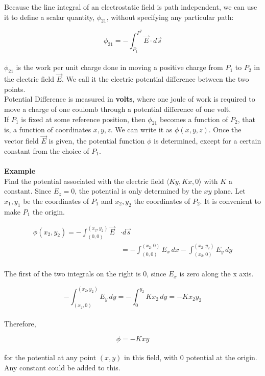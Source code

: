 \documentclass[svgnames]{article}
\begin{document}
Because the line integral of an electrostatic field is path independent, we can use it to define a scalar quantity, $\phi_{21}$, without specifying any particular path: 

\[ \phi_{21} = -\int_{P_1}^{P^2} \vec{E} \cdot d\vec{s} \] \\

$\phi_{21}$ is the work per unit charge done in moving a positive charge from $P_1$ to $P_2$ in the electric field $\vec{E}$. We call it the electric potential difference between the two points. \\ 
Potential Difference is measured in \textbf{volts}, where one joule of work is required to move a charge of one coulomb through a potential difference of one volt. \\
If $P_1$ is fixed at some reference position, then $\phi_{21}$ becomes a function of $P_2$, that is, a function of coordinates $x, y, z$. We can write it as $\phi(x, y, z)$. Once the vector field $\vec{E}$ is given, the potential function $\phi$ is determined, except for a certain constant from the choice of $P_1$. \\ \\

\textbf{Example} \\
Find the potential associated with the electric field $\langle Ky, Kx, 0 \rangle$ with $K$ a constant. Since $E_z = 0$, the potential is only determined by the $xy$ plane. Let $x_1, y_1$ be the coordinates of $P_1$ and $x_2, y_2$ the coordinates of $P_2$. It is convenient to make $P_1$ the origin. 

\begin{align*} 
\phi(x_2, y_2) = -\int_{(0,0)}^{(x_2,y_2)} \vec{E} &\cdot d\vec{s} \\ 
& = - \int_{(0,0)}^{(x_2, 0)} E_x \, dx - \int_{(x_2, 0)}^{(x_2, y_2)} E_y \, dy 
\end{align*} \\

The first of the two integrals on the right is 0, since $E_x$ is zero along the x axis. 

\[ -\int_{(x_2, 0)}^{(x_2, y_2)} E_y \, dy = -\int_0^{y_2} Kx_2\,dy = -Kx_2y_2 \] \\

Therefore, 

\[ \phi = -Kxy \] \\

for the potential at any point $(x,y)$ in this field, with 0 potential at the origin. Any constant could be added to this. \\ \\ 
\end{document}
